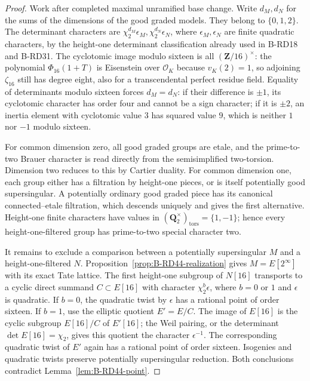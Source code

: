 \begin{proof}
Work after completed maximal unramified base change. Write $d_M,d_N$
for the sums of the dimensions of the good graded models.
They belong to $\{0,1,2\}$. The determinant characters are
$\chi_2^{d_M}\epsilon_M,\chi_2^{d_N}\epsilon_N$, where
$\epsilon_M,\epsilon_N$ are finite quadratic characters, by the
height-one determinant classification already used in B-RD18 and
B-RD31. The cyclotomic image modulo sixteen is all
$(\mathbf Z/16)^\times$: the polynomial $\Phi_{16}(1+T)$ is
Eisenstein over $\mathcal O_K$ because $v_K(2)=1$, so adjoining
$\zeta_{16}$ still has degree eight, also for a transcendental
perfect residue field.
Equality of determinants modulo sixteen forces $d_M=d_N$:
if their difference is $\pm1$, its cyclotomic character has
order four and cannot be a sign character; if it is $\pm2$,
an inertia element with cyclotomic value $3$ has squared value
$9$, which is neither $1$ nor $-1$ modulo sixteen.

For common dimension zero, all good graded groups are etale,
and the prime-to-two Brauer character is read directly from the
semisimplified two-torsion. Dimension two reduces to this by
Cartier duality. For common dimension one, each group either
has a filtration by height-one pieces, or is itself potentially
good supersingular. A potentially ordinary good graded piece
has its canonical connected--etale filtration, which descends
uniquely and gives the first alternative.
Height-one finite characters have values in
$(\mathbf Q_2^\times)_{\mathrm{tors}}=\{1,-1\}$; hence every
height-one-filtered group has prime-to-two special character two.

It remains to exclude a comparison between a potentially
supersingular $M$ and a height-one-filtered $N$.
Proposition~\ref{prop:B-RD44-realization} gives $M=E[2^\infty]$
with its exact Tate lattice. The first height-one subgroup of
$N[16]$ transports to a cyclic direct summand $C\subset E[16]$
with character $\chi_2^b\epsilon$, where $b=0$ or $1$ and
$\epsilon$ is quadratic. If $b=0$, the quadratic twist by
$\epsilon$ has a rational point of order sixteen.
If $b=1$, use the elliptic quotient $E'=E/C$.
The image of $E[16]$ is the cyclic subgroup $E[16]/C$ of
$E'[16]$; the Weil pairing, or the determinant $\det E[16]=\chi_2$,
gives this quotient the character $\epsilon^{-1}$.
The corresponding quadratic twist of $E'$ again has a rational
point of order sixteen. Isogenies and quadratic twists preserve
potentially supersingular reduction. Both conclusions contradict
Lemma~\ref{lem:B-RD44-point}.


\end{proof}
